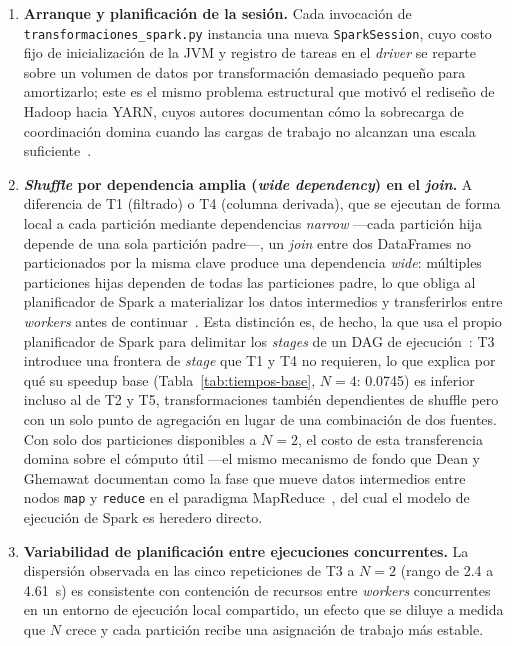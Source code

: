 \documentclass[11pt,a4paper]{article}
\begin{document}
    \begin{enumerate}
        \item \textbf{Arranque y planificación de la sesión.} Cada
        invocación de \texttt{transformaciones\_spark.py} instancia una
        nueva \texttt{SparkSession}, cuyo costo fijo de inicialización de
        la JVM y registro de tareas en el \emph{driver} se reparte sobre
        un volumen de datos por transformación demasiado pequeño para
        amortizarlo; este es el mismo problema estructural que motivó el
        rediseño de Hadoop hacia YARN, cuyos autores documentan cómo la
        sobrecarga de coordinación domina cuando las cargas de trabajo no
        alcanzan una escala suficiente~\cite{vavilapalli2013}.
        \item \textbf{\emph{Shuffle} por dependencia amplia (\emph{wide
        dependency}) en el \emph{join}.} A diferencia de T1 (filtrado) o
        T4 (columna derivada), que se ejecutan de forma local a cada
        partición mediante dependencias \emph{narrow} —cada partición
        hija depende de una sola partición padre—, un \emph{join} entre
        dos DataFrames no particionados por la misma clave produce una
        dependencia \emph{wide}: múltiples particiones hijas dependen de
        todas las particiones padre, lo que obliga al planificador de
        Spark a materializar los datos intermedios y transferirlos entre
        \emph{workers} antes de continuar~\cite{zaharia2012}. Esta
        distinción es, de hecho, la que usa el propio planificador de
        Spark para delimitar los \emph{stages} de un DAG de
        ejecución~\cite{zaharia2012}: T3 introduce una frontera de
        \emph{stage} que T1 y T4 no requieren, lo que explica por qué su
        speedup base (Tabla~\ref{tab:tiempos-base}, $N=4$: 0.0745) es
        inferior incluso al de T2 y T5, transformaciones también
        dependientes de shuffle pero con un solo punto de agregación en
        lugar de una combinación de dos fuentes. Con solo dos particiones
        disponibles a $N=2$, el costo de esta transferencia domina sobre
        el cómputo útil —el mismo mecanismo de fondo que Dean y Ghemawat
        documentan como la fase que mueve datos intermedios entre nodos
        \texttt{map} y \texttt{reduce} en el paradigma
        MapReduce~\cite{dean2008}, del cual el modelo de ejecución de
        Spark es heredero directo.
        \item \textbf{Variabilidad de planificación entre ejecuciones
        concurrentes.} La dispersión observada en las cinco repeticiones
        de T3 a $N=2$ (rango de \SI{2.4}{} a \SI{4.61}{\second}) es
        consistente con contención de recursos entre \emph{workers}
        concurrentes en un entorno de ejecución local compartido, un
        efecto que se diluye a medida que $N$ crece y cada partición
        recibe una asignación de trabajo más estable.
    \end{enumerate}
\end{document}
